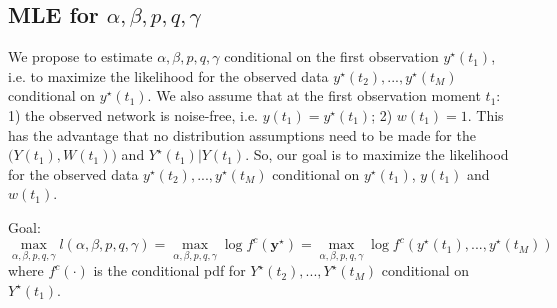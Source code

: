 \documentclass[10pt,letterpaper]{article}
\numberwithin{table}{section}
\numberwithin{figure}{section}
\numberwithin{equation}{section}
\begin{document}
\subsection{MLE for $\alpha,\beta,p,q,\gamma$}
We propose to estimate $\alpha,\beta,p,q,\gamma$ conditional on the first observation $y^\star(t_1)$, i.e. to maximize the likelihood for the observed data $y^\star(t_2),...,y^\star(t_M)$ conditional on $y^\star(t_1)$. We also assume that at the first observation moment $t_1$: 1) the observed network is noise-free, i.e. $y(t_1)= y^\star(t_1)$; 2) $w(t_1) = 1$. This has the advantage that no distribution assumptions need to be made for the $\big(Y(t_1),W(t_1)\big)$ and $Y^\star(t_1)|Y(t_1)$. So, our goal is to maximize the likelihood for the observed data $y^\star(t_2),...,y^\star(t_M)$ conditional on $y^\star(t_1)$, $y(t_1)$ and $w(t_1)$.

Goal: 
\begin{equation}
\max_{\alpha,\beta,p,q,\gamma} l(\alpha,\beta,p,q,\gamma) = \max_{\alpha,\beta,p,q,\gamma}\log f^c(\bm{y^\star}) =\max_{\alpha,\beta,p,q,\gamma} \log f^c(y^\star(t_1),...,y^\star(t_M))
\end{equation}
where $f^c(\cdot)$ is the conditional pdf for $Y^\star(t_2),...,Y^\star(t_M)$ conditional on $Y^\star(t_1)$.
\end{document}
